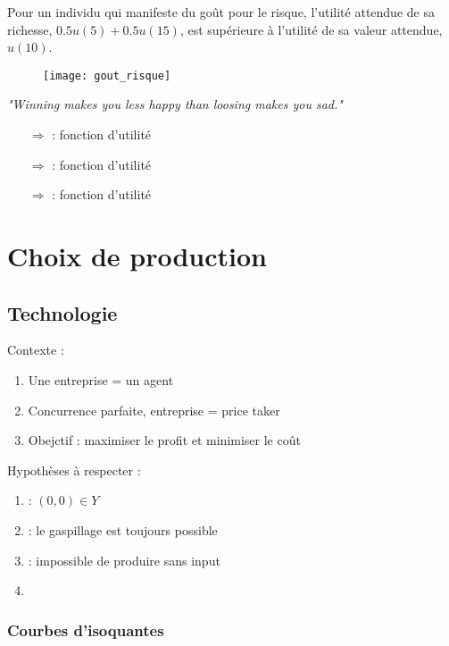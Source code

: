 Pour un individu qui manifeste du goût pour le risque, l'utilité attendue de sa richesse, $0.5u(5) + 0.5u(15)$, est supérieure à l'utilité de sa valeur attendue, $u(10)$.
\begin{figure}[H]
	\centering
	\texttt{[image: gout\_risque]}
\end{figure}

\textit{"Winning makes you less happy than loosing makes you sad."}
\begin{itemize}
\item[$\Rightarrow$]  : fonction d'utilité 
\item[$\Rightarrow$]  : fonction d'utilité 
\item[$\Rightarrow$]  : fonction d'utilité 
\end{itemize}

\section{Choix de production}

\subsection{Technologie}

Contexte :
\begin{enumerate}
\item Une entreprise = un agent
\item Concurrence parfaite, entreprise = price taker
\item Obejctif : maximiser le profit et minimiser le coût
\end{enumerate}

Hypothèses à respecter :
\begin{enumerate}
\item {} : $(0,0) \in Y$
\item {} : le gaspillage est toujours possible
\item {} : impossible de produire sans input
\item {}
\end{enumerate}

\subsubsection{Courbes d'isoquantes}

